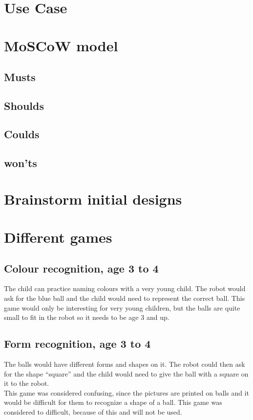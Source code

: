 \documentclass[11pt,twoside,a4paper]{report}
\begin{document}
\\
\begin{appendices}
\chapter{Use Case}
\label{appendix:usecase}
\chapter{MoSCoW model}
\label{appendix:moscow}
\section{Musts}
\section{Shoulds}
\section{Coulds}
\section{won'ts}
\chapter{Brainstorm initial designs}
\label{appendix:brainstorm}
\chapter{Different games}
\section{Colour recognition, age 3 to 4}
The child can practice naming colours with a very young child. The robot would ask for the blue ball and the child would need to represent the correct ball. This game would only be interesting for very young children, but the balls are quite small to fit in the robot so it needs to be age 3 and up.
\section{Form recognition, age 3 to 4}
The balls would have different forms and shapes on it. The robot could then ask for the shape “square” and the child would need to give the ball with a square on it to the robot.\\
This game was considered confusing, since the pictures are printed on balls and it would be difficult for them to recognize a shape of a ball. This game was considered to difficult, because of this and will not be used.

\end{appendices}
\end{document}
